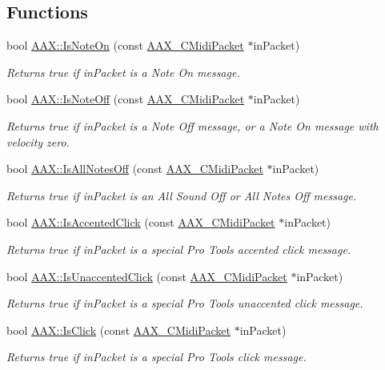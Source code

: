\subsection*{Functions}
\begin{DoxyCompactItemize}
\item 
bool \hyperlink{a00288_a1561efb3b1dbe3d13ef18f4b4d9dee40}{A\+A\+X\+::\+Is\+Note\+On} (const \hyperlink{a00024}{A\+A\+X\+\_\+\+C\+Midi\+Packet} $\ast$in\+Packet)
\begin{DoxyCompactList}\small\item\em Returns true if {\ttfamily in\+Packet} is a Note On message. \end{DoxyCompactList}\item 
bool \hyperlink{a00288_a91041690c271a718ef9451f66a7f6bb2}{A\+A\+X\+::\+Is\+Note\+Off} (const \hyperlink{a00024}{A\+A\+X\+\_\+\+C\+Midi\+Packet} $\ast$in\+Packet)
\begin{DoxyCompactList}\small\item\em Returns true if {\ttfamily in\+Packet} is a Note Off message, or a Note On message with velocity zero. \end{DoxyCompactList}\item 
bool \hyperlink{a00288_a509974acde19fde832cd5fdeb5eaabe2}{A\+A\+X\+::\+Is\+All\+Notes\+Off} (const \hyperlink{a00024}{A\+A\+X\+\_\+\+C\+Midi\+Packet} $\ast$in\+Packet)
\begin{DoxyCompactList}\small\item\em Returns true if {\ttfamily in\+Packet} is an All Sound Off or All Notes Off message. \end{DoxyCompactList}\item 
bool \hyperlink{a00288_afd05400c946e625772428cad4be7d552}{A\+A\+X\+::\+Is\+Accented\+Click} (const \hyperlink{a00024}{A\+A\+X\+\_\+\+C\+Midi\+Packet} $\ast$in\+Packet)
\begin{DoxyCompactList}\small\item\em Returns true if {\ttfamily in\+Packet} is a special Pro Tools accented click message. \end{DoxyCompactList}\item 
bool \hyperlink{a00288_a4f915a56cb150638f036cb7ed33facd8}{A\+A\+X\+::\+Is\+Unaccented\+Click} (const \hyperlink{a00024}{A\+A\+X\+\_\+\+C\+Midi\+Packet} $\ast$in\+Packet)
\begin{DoxyCompactList}\small\item\em Returns true if {\ttfamily in\+Packet} is a special Pro Tools unaccented click message. \end{DoxyCompactList}\item 
bool \hyperlink{a00288_a8f9544e49b4473862e0c1382f6963ce7}{A\+A\+X\+::\+Is\+Click} (const \hyperlink{a00024}{A\+A\+X\+\_\+\+C\+Midi\+Packet} $\ast$in\+Packet)
\begin{DoxyCompactList}\small\item\em Returns true if {\ttfamily in\+Packet} is a special Pro Tools click message. \end{DoxyCompactList}\end{DoxyCompactItemize}
